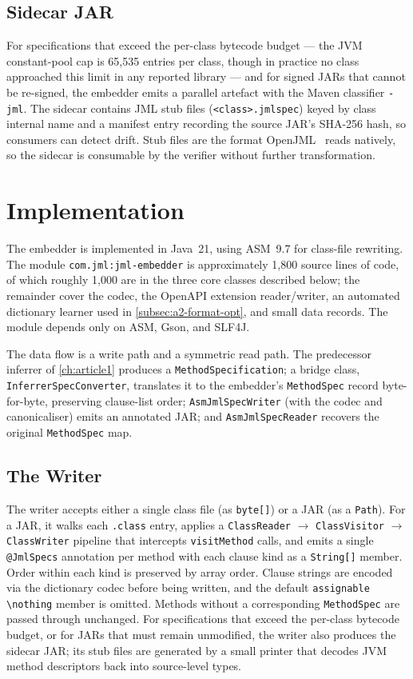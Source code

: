 \subsection{Sidecar JAR}

For specifications that exceed the per-class bytecode budget --- the JVM
constant-pool cap is 65{,}535 entries per class, though in practice no class
approached this limit in any reported library --- and for signed JARs that
cannot be re-signed, the embedder emits a parallel artefact with the Maven
classifier \texttt{-jml}. The sidecar contains JML stub files
(\texttt{<class>.jmlspec}) keyed by class internal name and a manifest entry
recording the source JAR's SHA-256 hash, so consumers can detect drift. Stub
files are the format OpenJML~\cite{cok2014openjml} reads natively, so the sidecar
is consumable by the verifier without further transformation.

\section{Implementation}
\label{sec:a2-impl}

The embedder is implemented in Java~21, using ASM~9.7 for class-file rewriting.
The module \texttt{com.jml:jml-embedder} is approximately 1{,}800 source lines of
code, of which roughly 1{,}000 are in the three core classes described below; the
remainder cover the codec, the OpenAPI extension reader/writer, an automated
dictionary learner used in \cref{subsec:a2-format-opt}, and small data records.
The module depends only on ASM, Gson, and SLF4J.

The data flow is a write path and a symmetric read path. The predecessor
inferrer of \cref{ch:article1} produces a \texttt{MethodSpecification}; a bridge
class, \texttt{InferrerSpecConverter}, translates it to the embedder's
\texttt{MethodSpec} record byte-for-byte, preserving clause-list order;
\texttt{AsmJmlSpecWriter} (with the codec and canonicaliser) emits an annotated
JAR; and \texttt{AsmJmlSpecReader} recovers the original \texttt{MethodSpec} map.

\subsection{The Writer}

The writer accepts either a single class file (as \texttt{byte[]}) or a JAR (as
a \texttt{Path}). For a JAR, it walks each \texttt{.class} entry, applies a
\texttt{ClassReader} $\to$ \texttt{ClassVisitor} $\to$ \texttt{ClassWriter}
pipeline that intercepts \texttt{visitMethod} calls, and emits a single
\texttt{@JmlSpecs} annotation per method with each clause kind as a
\texttt{String[]} member. Order within each kind is preserved by array order.
Clause strings are encoded via the dictionary codec before being written, and
the default \texttt{assignable \textbackslash nothing} member is omitted. Methods
without a corresponding \texttt{MethodSpec} are passed through unchanged. For
specifications that exceed the per-class bytecode budget, or for JARs that must
remain unmodified, the writer also produces the sidecar JAR; its stub files are
generated by a small printer that decodes JVM method descriptors back into
source-level types.

